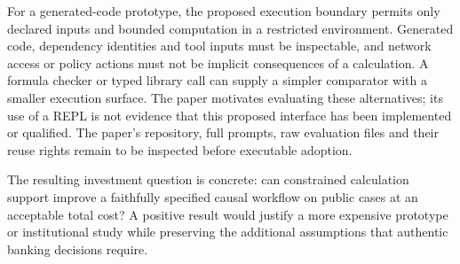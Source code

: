 For a generated-code prototype, the proposed execution boundary permits only
declared inputs and bounded computation in a restricted environment. Generated
code, dependency identities and tool inputs must be inspectable, and network
access or policy actions must not be implicit consequences of a calculation.
A formula checker or typed library call can supply a simpler comparator with
a smaller execution surface. The paper motivates evaluating these alternatives;
its use of a REPL is not evidence that this proposed interface has been
implemented or qualified. The paper's repository, full prompts, raw evaluation
files and their reuse rights remain to be inspected before executable adoption.
\citep{exec21_prophets}

The resulting investment question is concrete: can constrained calculation
support improve a faithfully specified causal workflow on public cases at an
acceptable total cost? A positive result would justify a more expensive
prototype or institutional study while preserving the additional assumptions
that authentic banking decisions require.
